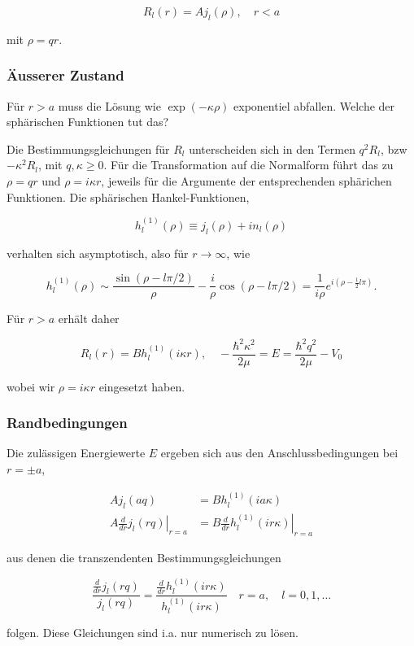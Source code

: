 \documentclass[10pt, letterpaper]{article}
\begin{document}
$$
R_{l}(r)=A j_{l}(\rho), \quad r<a
$$

mit $\rho=q r$.

\subsubsection*{Äusserer Zustand}
Für $r>a$ muss die Lösung wie $\exp (-\kappa \rho)$ exponentiel abfallen. Welche der sphärischen Funktionen tut das?

Die Bestimmungsgleichungen für $R_{l}$ unterscheiden sich in den Termen $q^{2} R_{l}$, bzw $-\kappa^{2} R_{l}$, mit $q, \kappa \geq 0$. Für die Transformation auf die Normalform führt das zu $\rho=q r$ und $\rho=i \kappa r$, jeweils für die Argumente der entsprechenden sphärichen Funktionen. Die sphärischen Hankel-Funktionen,

$$
h_{l}^{(1)}(\rho) \equiv j_{l}(\rho)+i n_{l}(\rho)
$$

verhalten sich asymptotisch, also für $r \rightarrow \infty$, wie

$$
h_{l}^{(1)}(\rho) \sim \frac{\sin (\rho-l \pi / 2)}{\rho}-\frac{i}{\rho} \cos (\rho-l \pi / 2)=\frac{1}{i \rho} e^{i\left(\rho-\frac{1}{2} l \pi\right)} .
$$

Für $r>a$ erhält daher

$$
R_{l}(r)=B h_{l}^{(1)}(i \kappa r), \quad-\frac{\hbar^{2} \kappa^{2}}{2 \mu}=E=\frac{\hbar^{2} q^{2}}{2 \mu}-V_{0}
$$

wobei wir $\rho=i \kappa r$ eingesetzt haben.

\subsubsection*{Randbedingungen}
Die zulässigen Energiewerte $E$ ergeben sich aus den Anschlussbedingungen bei $r= \pm a$,

$$
\begin{aligned}
A j_{l}(a q) & =B h_{l}^{(1)}(i a \kappa) \\
\left.A \frac{d}{d r} j_{l}(r q)\right|_{r=a} & =\left.B \frac{d}{d r} h_{l}^{(1)}(i r \kappa)\right|_{r=a}
\end{aligned}
$$

aus denen die transzendenten Bestimmungsgleichungen

$$
\frac{\frac{d}{d r} j_{l}(r q)}{j_{l}(r q)}=\frac{\frac{d}{d r} h_{l}^{(1)}(i r \kappa)}{h_{l}^{(1)}(i r \kappa)} \quad r=a, \quad l=0,1, \ldots
$$

folgen. Diese Gleichungen sind i.a. nur numerisch zu lösen.
\end{document}
